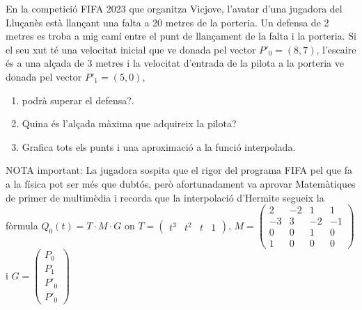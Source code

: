 \Exercise
\label{Ex:interpolacio3}

En la competició FIFA 2023 que organitza Vicjove, l'avatar d'una jugadora del Lluçanès està llançant una falta a 20 metres de la porteria.  Un defensa de 2 metres es troba a mig camí entre el punt de llançament de la falta i la porteria. Si el seu xut té una velocitat inicial que ve donada pel vector $P'_0=(8,7)$, l'escaire és a una alçada de 3 metres i la velocitat d'entrada de la pilota a la porteria ve donada pel vector $P'_1=(5,0)$,  
\begin{enumerate}
  \item podrà superar el defensa?.
  \item Quina és l'alçada màxima que adquireix la pilota?
  \item Grafica tots els punts i una aproximació a la funció interpolada.
\end{enumerate}
NOTA important: La jugadora sospita que el rigor del programa FIFA pel que fa a la física pot ser més que dubtós, però afortunadament va aprovar Matemàtiques de primer de multimèdia i recorda que la interpolació d'Hermite segueix la fòrmula $Q_0(t)=T\cdot M \cdot G$ on
$  T= \begin{pmatrix}t^3 & t^2 & t & 1\end{pmatrix}$, 
$M= \begin{pmatrix}
              2 & -2 & 1 & 1 \\
              -3 & 3 & -2 & -1 \\
              0 & 0 & 1 & 0 \\
              1 & 0 & 0 & 0
        \end{pmatrix}$ i 
        $G= \begin{pmatrix}
              P_0 \\
              P_1 \\
              P'_0 \\
              P'_0
        \end{pmatrix}$

\Answer 

